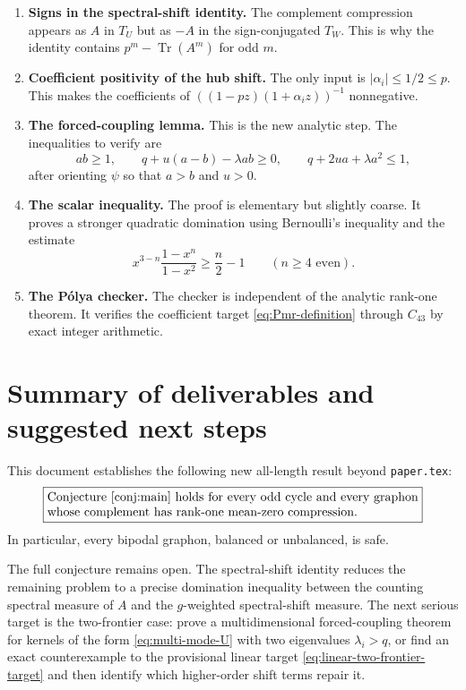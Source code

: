 \documentclass[11pt]{article}
\newcommand{\Tr}{\operatorname{Tr}}
\begin{document}
\begin{enumerate}[label=\textup{(\arabic*)}]
    \item \textbf{Signs in the spectral-shift identity.}  The complement compression appears as $A$ in $T_U$ but as $-A$ in the sign-conjugated $T_W$.  This is why the identity contains $p^m-\Tr(A^m)$ for odd $m$.

    \item \textbf{Coefficient positivity of the hub shift.}  The only input is $|\alpha_i|\le1/2\le p$.  This makes the coefficients of $((1-pz)(1+\alpha_i z))^{-1}$ nonnegative.

    \item \textbf{The forced-coupling lemma.}  This is the new analytic step.  The inequalities to verify are
    \[
        ab\ge1,
        \qquad
        q+u(a-b)-\lambda ab\ge0,
        \qquad
        q+2ua+\lambda a^2\le1,
    \]
    after orienting $\psi$ so that $a>b$ and $u>0$.

    \item \textbf{The scalar inequality.}  The proof is elementary but slightly coarse.  It proves a stronger quadratic domination using Bernoulli's inequality and the estimate
    \[
        x^{3-n}\frac{1-x^n}{1-x^2}\ge\frac n2-1
        \qquad(n\ge4\text{ even}).
    \]

    \item \textbf{The P\'olya checker.}  The checker is independent of the analytic rank-one theorem.  It verifies the coefficient target \eqref{eq:Pmr-definition} through $C_{43}$ by exact integer arithmetic.
\end{enumerate}

\section{Summary of deliverables and suggested next steps}

This document establishes the following new all-length result beyond \texttt{paper.tex}:
\[
\boxed{\begin{minipage}{0.86\linewidth}
Conjecture~\ref{conj:main} holds for every odd cycle and every graphon whose complement has rank-one mean-zero compression.
\end{minipage}}
\]
In particular, every bipodal graphon, balanced or unbalanced, is safe.

The full conjecture remains open.  The spectral-shift identity reduces the remaining problem to a precise domination inequality between the counting spectral measure of $A$ and the $g$-weighted spectral-shift measure.  The next serious target is the two-frontier case: prove a multidimensional forced-coupling theorem for kernels of the form \eqref{eq:multi-mode-U} with two eigenvalues $\lambda_i>q$, or find an exact counterexample to the provisional linear target \eqref{eq:linear-two-frontier-target} and then identify which higher-order shift terms repair it.
\end{document}
